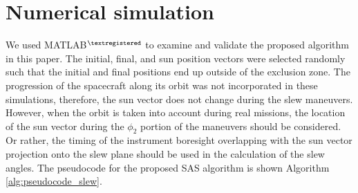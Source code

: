 \documentclass[letterpaper, paper,12pt]{AAS}		%
\begin{document}
\section{Numerical simulation} 
We used MATLAB$^{\textregistered}$ to examine and validate the proposed algorithm in this paper. The initial, final, and sun position vectors were selected randomly such that the initial and final positions end up outside of the exclusion zone. The progression of the spacecraft along its orbit was not incorporated in these simulations, therefore, the sun vector does not change during the slew maneuvers. However, when the orbit is taken into account during real missions, the location of the sun vector during the $\phi_2$ portion of the maneuvers should be considered. Or rather, the timing of the instrument boresight overlapping with the sun vector projection onto the slew plane should be used in the calculation of the slew angles. 
The pseudocode for the proposed SAS algorithm is shown Algorithm \ref{alg:pseudocode_slew}.   
	
\end{document}
